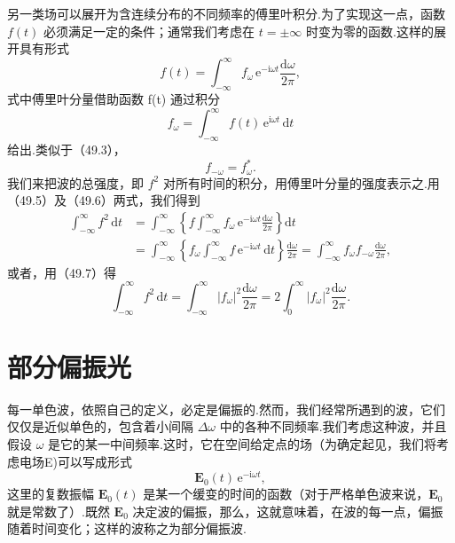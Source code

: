 另一类场可以展开为含连续分布的不同频率的傅里叶积分.为了实现这一点，函数 $f(t)$ 必须满足一定的条件；通常我们考虑在 $t = \pm\infty$ 时变为零的函数.这样的展开具有形式
\begin{equation}
  f(t)=\int_{-\infty}^{\infty}f_\omega\,\mathrm{e}^{-\mathrm{i}\omega t}
  \frac{\mathrm{d}\omega}{2\pi},
\end{equation}
式中傅里叶分量借助函数 f(t) 通过积分
\begin{equation}
  f_\omega=\int_{-\infty}^{\infty}f(t)\,\mathrm{e}^{\mathrm{i}\omega t}\,\mathrm{d}t
\end{equation}
给出.类似于（49.3），
\begin{equation}
  f_{-\omega}=f_\omega^*.
\end{equation}
我们来把波的总强度，即 $f^2$ 对所有时间的积分，用傅里叶分量的强度表示之.用（49.5）及（49.6）两式，我们得到
\begin{equation*}
\begin{aligned}
  \int_{-\infty}^{\infty}f^2\,\mathrm{d}t
  &=\int_{-\infty}^{\infty}\left\{f\int_{-\infty}^{\infty}
  f_\omega\,\mathrm{e}^{-\mathrm{i}\omega t}\frac{\mathrm{d}\omega}{2\pi}\right\}\mathrm{d}t\\
  &=\int_{-\infty}^{\infty}\left\{f_\omega\int_{-\infty}^{\infty}
  f\,\mathrm{e}^{-\mathrm{i}\omega t}\,\mathrm{d}t\right\}\frac{\mathrm{d}\omega}{2\pi}
  =\int_{-\infty}^{\infty}f_\omega f_{-\omega}\frac{\mathrm{d}\omega}{2\pi},
\end{aligned}
\end{equation*}
或者，用（49.7）得
\begin{equation}
  \int_{-\infty}^{\infty}f^2\,\mathrm{d}t
  =\int_{-\infty}^{\infty}|f_\omega|^2\frac{\mathrm{d}\omega}{2\pi}
  =2\int_0^{\infty}|f_\omega|^2\frac{\mathrm{d}\omega}{2\pi}.
\end{equation}

\section{部分偏振光}

每一单色波，依照自己的定义，必定是偏振的.然而，我们经常所遇到的波，它们仅仅是近似单色的，包含着小间隔 $\Delta\omega$ 中的各种不同频率.我们考虑这种波，并且假设 $\omega$ 是它的某一中间频率.这时，它在空间给定点的场（为确定起见，我们将考虑电场E)可以写成形式
\begin{equation*}
  \boldsymbol{E}_0(t)\,\mathrm{e}^{-\mathrm{i}\omega t},
\end{equation*}
这里的复数振幅 $\boldsymbol{E}_0(t)$ 是某一个缓变的时间的函数（对于严格单色波来说，$\boldsymbol{E}_0$ 就是常数了）.既然 $\boldsymbol{E}_0$ 决定波的偏振，那么，这就意味着，在波的每一点，偏振随着时间变化；这样的波称之为部分偏振波.


